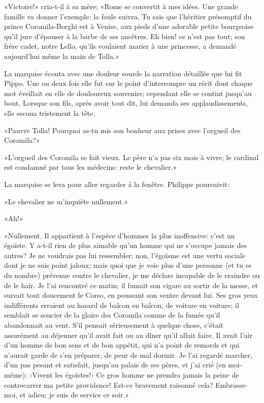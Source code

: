 «Victoire!» cria-t-il à sa mère; «Rome se convertit à mes idées. Une
grande famille va donner l'exemple: la foule suivra. Tu sais que
l'héritier présomptif du prince Coromila-Borghi est à Venise, aux pieds
d'une adorable petite bourgeoise qu'il jure d'épouser à la barbe de ses
ancêtres. Eh bien! ce n'est pas tout; son frère cadet, notre Lello,
qu'ils voulaient marier à une princesse, a demandé aujourd'hui même la
main de Tolla.»

La marquise écouta avec une douleur sourde la narration détaillée que
lui fit Pippo. Une ou deux fois elle fut sur le point d'interrompre un
récit dont chaque mot éveillait en elle de douloureux souvenirs;
cependant elle se contint jusqu'au bout. Lorsque son fils, après avoir
tout dit, lui demanda ses applaudissements, elle secoua tristement la
tête.

«Pauvre Tolla! Pourquoi as-tu mis son bonheur aux prises avec l'orgueil
des Coromila?»

«L'orgueil des Coromila se fait vieux. Le père n'a pas six mois à vivre;
le cardinal est condamné par tous les médecins: reste le chevalier.»

La marquise se leva pour aller regarder å la fenêtre. Philippe
poursuivit:

«Le chevalier ne m'inquiète nullement.»

«Ah!»

«Nullement. Il appartient à l'espèce d'hommes la plus inoffensive: c'est
un égoïste. Y a-t-il rien de plus aimable qu'un homme qui ne s'occupe
jamais des autres? Je ne voudrais pas lui ressembler: non, l'égoïsme est
une vertu sociale dont je ne suis point jaloux; mais quoi que je voie
plus d'une personne (et tu es du nombre) prévenue contre le chevalier,
je me déclare incapable de le craindre ou de le haïr. Je l'ai rencontré
ce matin; il fumait son cigare au sortir de la messe, et suivait tout
doucement le Corso, en poussant son ventre devant lui. Ses gros yeux
indifférents erraient au hasard de balcon en balcon, de voiture en
voiture; il semblait se soucier de la gloire des Coromila comme de la
fumée qu'il abandonnait au vent. S'il pensait sérieusement à quelque
chose, c'était assurément au déjeuner qu'il avait fait ou au dîner qu'il
allait faire. Il avait l'air d'un homme de bon sens et de bon appétit,
qui n'a point de remords et qui n'aurait garde de s'en préparer, de peur
de mal dormir. Je l'ai regardé marcher, d'un pas pesant et satisfait,
jusqu'au palais de ses pères, et j'ai crié (en moi-même): ‹Vivent les
égoïstes!› Ce gros homme ne prendra jamais la peine de contrecarrer ma
petite providence! Est-ce bravement raisonné cela? Embrasse-moi, et
adieu; je suis de service ce soir.»

